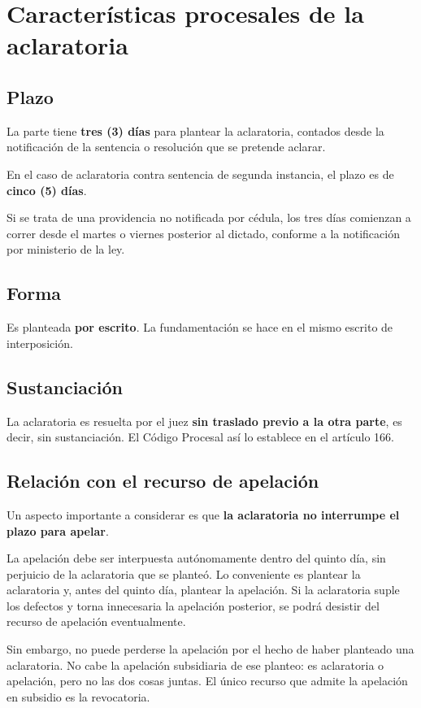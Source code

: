\documentclass[12pt,oneside]{book}
\begin{document}
\section{Características procesales de la aclaratoria}

\subsection{Plazo}

La parte tiene \textbf{tres (3) días} para plantear la aclaratoria, contados desde la notificación de la sentencia o resolución que se pretende aclarar.

En el caso de aclaratoria contra sentencia de segunda instancia, el plazo es de \textbf{cinco (5) días}.

Si se trata de una providencia no notificada por cédula, los tres días comienzan a correr desde el martes o viernes posterior al dictado, conforme a la notificación por ministerio de la ley.

\subsection{Forma}

Es planteada \textbf{por escrito}. La fundamentación se hace en el mismo escrito de interposición.

\subsection{Sustanciación}

La aclaratoria es resuelta por el juez \textbf{sin traslado previo a la otra parte}, es decir, sin sustanciación. El Código Procesal así lo establece en el artículo 166.

\subsection{Relación con el recurso de apelación}

Un aspecto importante a considerar es que \textbf{la aclaratoria no interrumpe el plazo para apelar}.

\begin{important}
La apelación debe ser interpuesta autónomamente dentro del quinto día, sin perjuicio de la aclaratoria que se planteó. Lo conveniente es plantear la aclaratoria y, antes del quinto día, plantear la apelación. Si la aclaratoria suple los defectos y torna innecesaria la apelación posterior, se podrá desistir del recurso de apelación eventualmente.

Sin embargo, no puede perderse la apelación por el hecho de haber planteado una aclaratoria. No cabe la apelación subsidiaria de ese planteo: es aclaratoria o apelación, pero no las dos cosas juntas. El único recurso que admite la apelación en subsidio es la revocatoria.
\end{important}
\end{document}
